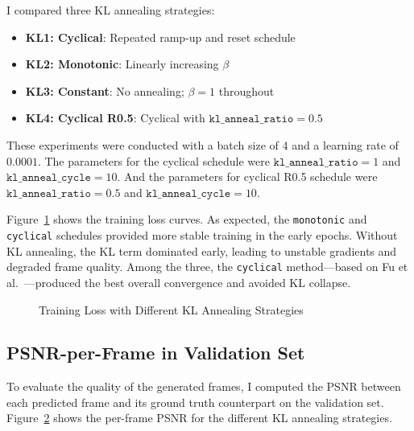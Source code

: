 I compared three KL annealing strategies:

\begin{itemize}
    \item \textbf{KL1: Cyclical}: Repeated ramp-up and reset schedule
    \item \textbf{KL2: Monotonic}: Linearly increasing $\beta$
    \item \textbf{KL3: Constant}: No annealing; $\beta = 1$ throughout
    \item \textbf{KL4: Cyclical R0.5}: Cyclical with $\texttt{kl\_anneal\_ratio} = 0.5$
\end{itemize}

These experiments were conducted with a batch size of 4 and a learning rate of $0.0001$.
The parameters for the cyclical schedule were $\texttt{kl\_anneal\_ratio} = 1$ and $\texttt{kl\_anneal\_cycle} = 10$.
And the parameters for cyclical R0.5 schedule were $\texttt{kl\_anneal\_ratio} = 0.5$ and $\texttt{kl\_anneal\_cycle} = 10$.


Figure~\ref{fig:loss_kl_modes} shows the training loss curves. As expected, the \texttt{monotonic} and \texttt{cyclical} schedules provided more stable training in the early epochs. Without KL annealing, the KL term dominated early, leading to unstable gradients and degraded frame quality. Among the three, the \texttt{cyclical} method—based on Fu et al.~\cite{fu_cyclical_2019_naacl}—produced the best overall convergence and avoided KL collapse.

\begin{figure}[H]
    \centering
    
    \caption{Training Loss with Different KL Annealing Strategies}
    \label{fig:loss_kl_modes}
\end{figure}

\subsection{PSNR-per-Frame in Validation Set}

To evaluate the quality of the generated frames, I computed the PSNR between each predicted frame and its ground truth counterpart on the validation set. Figure~\ref{fig:psnr_curve} shows the per-frame PSNR for the different KL annealing strategies.

\begin{figure}[H]
    \centering
    
    \label{fig:psnr_curve}
\end{figure}

